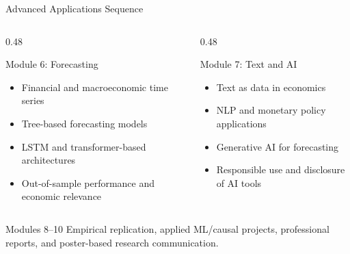 \documentclass[aspectratio=169,11pt]{beamer}
\begin{document}
\begin{frame}{Advanced Applications Sequence}
\begin{columns}[T,onlytextwidth]
\begin{column}{0.48\textwidth}
\begin{block}{Module 6: Forecasting}
\begin{itemize}
    \item Financial and macroeconomic time series
    \item Tree-based forecasting models
    \item LSTM and transformer-based architectures
    \item Out-of-sample performance and economic relevance
\end{itemize}
\end{block}
\end{column}
\begin{column}{0.48\textwidth}
\begin{block}{Module 7: Text and AI}
\begin{itemize}
    \item Text as data in economics
    \item NLP and monetary policy applications
    \item Generative AI for forecasting
    \item Responsible use and disclosure of AI tools
\end{itemize}
\end{block}
\end{column}
\end{columns}

\vspace{0.2em}
\begin{block}{Modules 8--10}
Empirical replication, applied ML/causal projects, professional reports, and poster-based research communication.
\end{block}
\end{frame}
\end{document}
